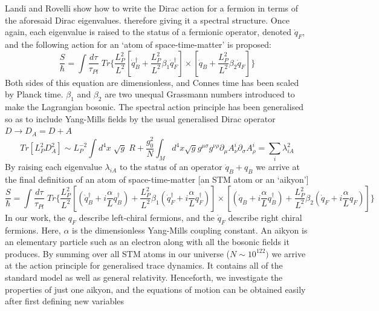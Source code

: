 \documentclass{iopconfser}
\begin{document}
Landi and Rovelli show how to write the Dirac action for a fermion in terms of the aforesaid Dirac eigenvalues. therefore giving it a spectral structure. Once again, each eigenvalue is raised to the status of a fermionic operator, denoted $\dot{q}_F$, and the following action for an `atom of space-time-matter' is proposed:
\begin{equation}
 \frac{S}{\hbar}= \int \frac{d\tau}{\tau_{Pl}}\; Tr \bigg\{ \frac{L_P^2}{L^2}\left[\dot{q}_B^\dagger +  \frac{L_P^2}{L^2}\beta_1 \dot{q}_F^\dagger \right ] \times \left[\dot{q}_B + \frac{L_P^2}{L^2} \beta_2 \dot{q}_F\right] \bigg\}
\end{equation}
Both sides of this equation are dimensionless, and Connes time has been scaled by Planck time. $\beta_1$ and $\beta_2$ are two unequal Grassmann numbers introduced to make the Lagrangian bosonic. The spectral action principle has been generalised so as to include Yang-Mills fields by the usual generalised Dirac operator $D\rightarrow D_A = D + A$
\begin{equation}
Tr [L_P^2 D_A^2] \sim L_P^{-2}\int d^4x\; \sqrt{g}\; R   + \frac{g_0^2}{N} \int_M d^4x \sqrt{g} g^{\mu\sigma}g^{\nu\rho}\partial_\mu A^i_\nu\partial_\sigma A^i_\rho  =\sum_{i}\lambda_{iA}^2
\end{equation}
By raising each eigenvalue $\lambda_{iA}$ to the status of an operator $\dot{q}_B + q_B$ we arrive at the final definition of an atom of space-time-matter [an STM atom or an `aikyon']
\begin{equation}
\frac{S}{\hbar}= \int \frac{d\tau}{\tau_{Pl}}\; Tr \bigg\{ \frac{L_P^2}{L^2}\left[\left(\dot{q}_B^\dagger + i\frac{\alpha}{L} q_B^\dagger\right) + \frac{L_P^2}{L^2}\beta_1\left( \dot{q}_F^\dagger + i\frac{\alpha}{L}q_F^\dagger\right)\right ] \times \left[\left(\dot{q}_B + i\frac{\alpha}{L}q_B^\dagger\right) + \frac{L_P^2}{L^2} \beta_2 \left(\dot{q}_F+ i\frac{\alpha}{L}q_F\right)\right] \bigg\}
 \label{aikyacn2}
\end{equation}
In our work, the $q_F$ describe left-chiral fermions, and the $\dot{q}_F$ describe right chiral fermions. Here, $\alpha$ is the dimensionless Yang-Mills coupling constant. An aikyon is an elementary particle such as an electron along with all the bosonic fields it produces. By summing over all STM atoms in our universe ($N\sim 10^{122})$ we arrive at the action principle for generalised trace dynamics. It contains all of the standard model as well as general relativity. Henceforth, we investigate the properties of just one aikyon, and the equations of motion can be obtained easily after first defining new variables
\end{document}
